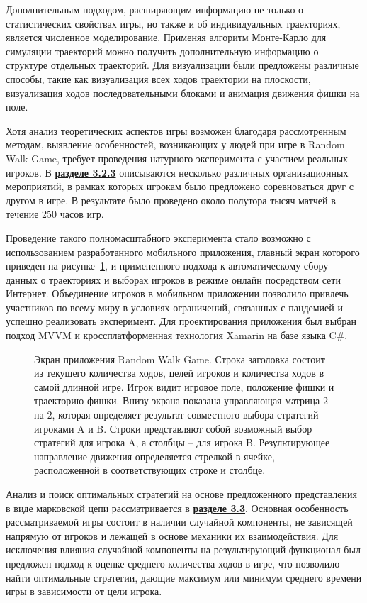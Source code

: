 Дополнительным подходом, расширяющим информацию не только о статистических свойствах игры, но также и об индивидуальных траекториях, является численное моделирование. Применяя алгоритм Монте-Карло для симуляции траекторий можно получить дополнительную информацию о структуре отдельных траекторий. Для визуализации были предложены различные способы, такие как визуализация всех ходов траектории на плоскости, визуализация ходов последовательными блоками и анимация движения фишки на поле. 

Хотя анализ теоретических аспектов игры возможен благодаря рассмотренным методам, выявление особенностей, возникающих у людей при игре в Random Walk Game, требует проведения натурного эксперимента с участием реальных игроков. В \underline{\textbf{разделе 3.2.3}} описываются несколько различных организационных мероприятий, в рамках которых игрокам было предложено соревноваться друг с другом в игре. В результате было проведено около полутора тысяч матчей в течение 250 часов игр.

Проведение такого полномасштабного эксперимента стало возможно с использованием разработанного мобильного приложения, главный экран которого приведен на рисунке~\cref{fig:screenshot_game_field_ref}, и примененного подхода к автоматическому сбору данных о траекториях и выборах игроков в режиме онлайн посредством сети Интернет. Объединение игроков в мобильном приложении позволило привлечь участников по всему миру в условиях ограничений, связанных с пандемией и успешно реализовать эксперимент. Для проектирования приложения был выбран подход MVVM и кроссплатформенная технология Xamarin на базе языка C$\mathsf{\#}$.

\begin{figure}[ht]
    \caption{
        Экран приложения Random Walk Game. Строка заголовка состоит из текущего количества ходов, 
        целей игроков и количества ходов в самой длинной игре. Игрок видит игровое поле, положение фишки и траекторию фишки. Внизу экрана показана управляющая матрица $2$ на $2$, которая определяет результат совместного выбора стратегий игроками A и B. Строки представляют собой возможный выбор стратегий для игрока A, а столбцы -- для игрока B. Результирующее направление движения  определяется стрелкой в ячейке, расположенной в соответствующих строке и столбце.
    }\label{fig:screenshot_game_field_ref}
\end{figure}

Анализ и поиск оптимальных стратегий на основе предложенного представления в виде марковской цепи рассматривается в \underline{\textbf{разделе 3.3}}. Основная особенность рассматриваемой игры состоит в наличии случайной компоненты, не зависящей напрямую от игроков и лежащей в основе механики их взаимодействия. Для исключения влияния случайной компоненты на результирующий функционал был предложен подход к оценке среднего количества ходов в игре, что позволило найти оптимальные стратегии, дающие максимум или минимум среднего времени игры в зависимости от цели игрока.

